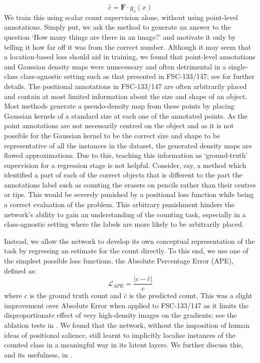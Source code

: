 \documentclass[../thesis.tex]{subfiles}
\begin{document}
\begin{equation}
    \hat{c}= \mathbf{F} \cdot g_s(x)
\end{equation}
We train this using scalar count supervision alone, without using point-level annotations.
Simply put, we ask the method to generate an answer to the question `How many things are there in an image?' and motivate it only by telling it how far off it was from the correct number.
Although it may seem that a location-based loss should aid in training, we found that point-level annotations and Gaussian density maps were unnecessary and often detrimental in a single-class class-agnostic setting such as that presented in FSC-133/147; see  for further details.
The positional annotations in FSC-133/147 are often arbitrarily placed and contain at most limited information about the size and shape of an object. 
Most methods generate a pseudo-density map from these points by placing Gaussian kernels of a standard size at each one of the annotated points.
As the point annotations are not necessarily centred on the object and as it is not possible for the Gaussian kernel to  be the correct size and shape to be representative of all the instances in the dataset, the generated density maps are flawed approximations.
Due to this, teaching this information as `ground-truth' supervision for a regression stage is not helpful. 
Consider, say, a method which identified a part of each of the correct objects that is different to the part the annotations label such as counting the erasers on pencils rather than their centres or tips.
This would be severely punished by a positional loss function while being a correct evaluation of the problem. 
This arbitrary punishment hinders the network's ability to gain an understanding of the counting task, especially in a class-agnostic setting where the labels are more likely to be arbitrarily placed.

Instead, we allow the network to develop its own conceptual representation of the task by regressing an estimate for the count directly. 
To this end, we use one of the simplest possible loss functions, the Absolute Percentage Error (APE), defined as: 
\begin{equation}\label{eq__LTCA__mape}
    \mathcal{L}_{APE} = \frac{\lvert c - \hat{c} \rvert}{c} 
\end{equation}
where $c$ is the ground truth count and $\hat{c}$ is the predicted count. This was a slight improvement over Absolute Error when applied to FSC-133/147 as it limits the disproportionate effect of very high-density images on the gradients; see the ablation tests in .
We found that the network, without the imposition of human ideas of positional salience, still learnt to implicitly localise instances of the counted class in a meaningful way in its latent layers. We further discuss this, and its usefulness, in .
\end{document}
